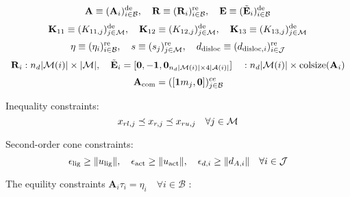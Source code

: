 \documentclass[a4paper,10pt]{article}
\begin{document}
\begin{equation}\notag
\mathbf{A} \equiv (\mathbf{A}_i)^\text{de}_{i \in \mathcal{B}}, \quad
\mathbf{R} \equiv (\mathbf{R}_i)^\text{re}_{i \in \mathcal{B}}, \quad
\mathbf{E} \equiv (\tilde{\mathbf{E}}_i)^\text{de}_{i \in \mathcal{B}}
\end{equation}
\begin{equation}\notag
\mathbf{K}_{11} \equiv (K_{11,j})^{\text{de}}_{j \in \mathcal{M}}, \quad
\mathbf{K}_{12} \equiv (K_{12,j})^{\text{de}}_{j \in \mathcal{M}}, \quad
\mathbf{K}_{13} \equiv (K_{13,j})^{\text{de}}_{j \in \mathcal{M}}
\end{equation}
\begin{equation}\notag
\eta             \equiv (\eta_i)^\text{re}_{i \in \mathcal{B}}, \quad
s                \equiv (s_j)^{\text{re}}_{j \in \mathcal{M}}, \quad
d_\text{disloc}  \equiv (d_{\text{disloc},i})^{\text{re}}_{i \in \mathcal{J}}
\end{equation}
\begin{equation}\notag
\mathbf{R}_i : n_d | \mathcal{M}(i) | \times |\mathcal{M}|, \quad
\tilde{\mathbf{E}}_i = [\mathbf{0},-\mathbf{1},\mathbf{0}_{n_d | \mathcal{M}(i) | \times 4|\mathcal{A}(i)|}] \quad : n_d | \mathcal{M}(i) | \times \text{colsize}(\mathbf{A}_i)
\end{equation}
\begin{equation}\notag
\mathbf{A}_\text{com} = ([ \mathbf{1}m_j, \mathbf{0} ])^{ce}_{j \in \mathcal{B}}
\end{equation}

\noindent Inequality constraints:
\begin{equation}\notag
x_{rl,j} \preceq x_{r,j} \preceq x_{ru,j} \quad \forall j\in \mathcal{M}
\end{equation}

\noindent Second-order cone constraints:
\begin{equation}\notag
\epsilon_\text{lig} \geq \| u_\text{lig} \|, \quad \epsilon_\text{act} \geq \| u_\text{act} \|, \quad
\epsilon_{d,i} \geq \| d_{A,i} \| \quad \forall i \in \mathcal{J}
\end{equation}

\pagebreak

\noindent The equility constraints $\mathbf{A}_i \tau_i = \eta_i \quad \forall i \in \mathcal{B}$ :
\end{document}

